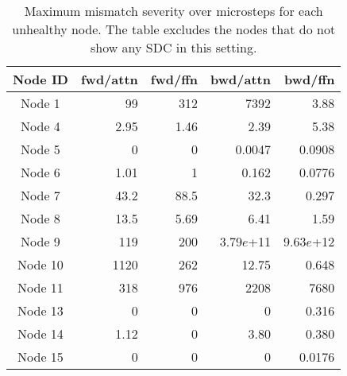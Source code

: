 \begin{table}[t]
\begin{center}
\begin{small}
\begin{sc}
\setlength{\tabcolsep}{3pt}
\renewcommand{\arraystretch}{1.1} 
\begin{tabular}{crrrr}
\toprule
Node ID & fwd/attn & fwd/ffn & bwd/attn & bwd/ffn \\
\midrule
Node 1 & 99 & 312 & 7392 & 3.88 \\
Node 4 & 2.95 & 1.46 & 2.39 & 5.38 \\
Node 5 & 0 & 0 & 0.0047 & 0.0908 \\
Node 6 & 1.01 & 1 & 0.162 & 0.0776 \\
Node 7 & 43.2 & 88.5 & 32.3 & 0.297 \\ 
Node 8 & 13.5 & 5.69 & 6.41 & 1.59 \\ 
Node 9 & 119 & 200 & 3.79$e$+11 & 9.63$e$+12 \\ 
Node 10 & 1120 & 262 & 12.75 & 0.648 \\
 Node 11 & 318 & 976 & 2208 & 7680 \\ 
Node 13 & 0 & 0 & 0 & 0.316 \\ 
Node 14 & 1.12 & 0 & 3.80 & 0.380 \\ 
Node 15 & 0 & 0 & 0 & 0.0176 \\ \bottomrule
\end{tabular}

\end{sc}
\end{small}
\end{center}
\vskip -0.1in
\caption{Maximum mismatch severity over microsteps for each unhealthy node. The table excludes the nodes that do not show any SDC in this setting.}
\vskip -0.1in
\label{fig:primitive_severity_summarized}

\end{table}

